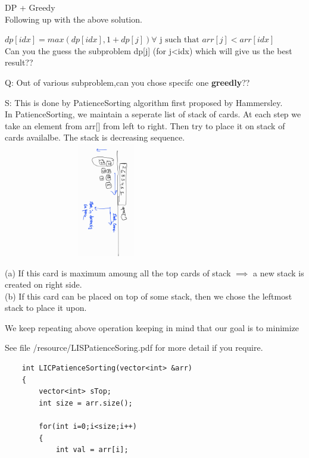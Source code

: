 \begin{solution}
    DP + Greedy\\
    Following up with the above solution.
    
    $dp[idx] = max(dp[idx] , 1+dp[j]) \forall \text{ j such that } arr[j] < arr[idx]$\\
    Can you the guess the subproblem dp[j] (for j<idx) which will give us the best result??

    \medskip
    Q: Out of various subproblem,can you chose specifc one \textbf{greedly}?? \newline

    \smallskip
    S: This is done by PatienceSorting algorithm first proposed by Hammersley.\\ In PatienceSorting, we maintain a seperate list of stack of cards.
        At each step we take an element from arr[] from left to right. Then try to place it on stack of cards availalbe.
        The stack is decreasing sequence.\\
        
        \includegraphics[angle=90,width=9cm,height=5cm]{./resources/PatienceSoring.jpg}
        
        (a) If this card is maximum amoung all the top cards of stack $\implies$ a new stack is created on right side.\\
        (b) If this card can be placed on top of some stack, then we chose the leftmost stack to place it upon.
        
        We keep repeating above operation keeping in mind that our goal is to minimize 

        See file /resource/LISPatienceSoring.pdf for more detail if you require.

    \begin{verbatim}
    int LICPatienceSorting(vector<int> &arr)
    {
        vector<int> sTop; 
        int size = arr.size();
        
        for(int i=0;i<size;i++)
        {
            int val = arr[i];
            

\end{verbatim}
\end{solution}
